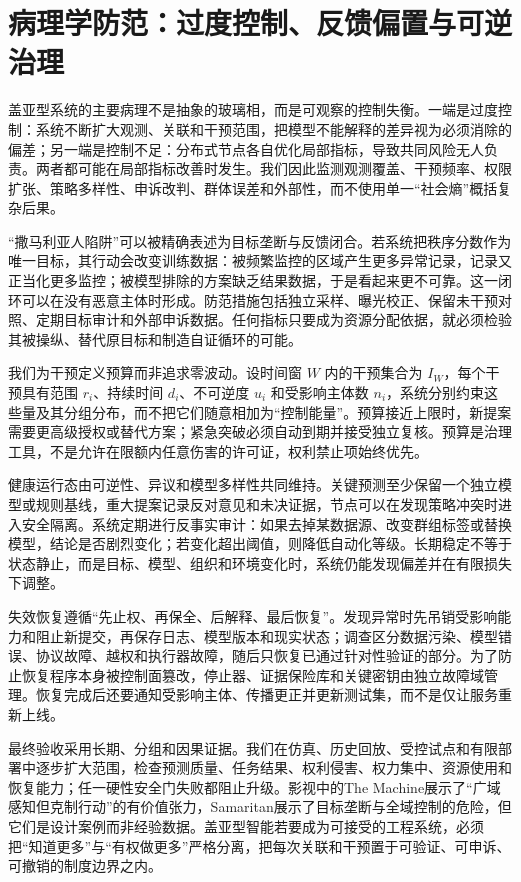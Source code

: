 \section{病理学防范：过度控制、反馈偏置与可逆治理}
\label{sec:gaia_pathology}

盖亚型系统的主要病理不是抽象的玻璃相，而是可观察的控制失衡。一端是过度控制：系统不断扩大观测、关联和干预范围，把模型不能解释的差异视为必须消除的偏差；另一端是控制不足：分布式节点各自优化局部指标，导致共同风险无人负责。两者都可能在局部指标改善时发生。我们因此监测观测覆盖、干预频率、权限扩张、策略多样性、申诉改判、群体误差和外部性，而不使用单一“社会熵”概括复杂后果。

“撒马利亚人陷阱”可以被精确表述为目标垄断与反馈闭合。若系统把秩序分数作为唯一目标，其行动会改变训练数据：被频繁监控的区域产生更多异常记录，记录又正当化更多监控；被模型排除的方案缺乏结果数据，于是看起来更不可靠。这一闭环可以在没有恶意主体时形成。防范措施包括独立采样、曝光校正、保留未干预对照、定期目标审计和外部申诉数据。任何指标只要成为资源分配依据，就必须检验其被操纵、替代原目标和制造自证循环的可能。

我们为干预定义预算而非追求零波动。设时间窗 $W$ 内的干预集合为 $I_W$，每个干预具有范围 $r_i$、持续时间 $d_i$、不可逆度 $u_i$ 和受影响主体数 $n_i$，系统分别约束这些量及其分组分布，而不把它们随意相加为“控制能量”。预算接近上限时，新提案需要更高级授权或替代方案；紧急突破必须自动到期并接受独立复核。预算是治理工具，不是允许在限额内任意伤害的许可证，权利禁止项始终优先。

健康运行态由可逆性、异议和模型多样性共同维持。关键预测至少保留一个独立模型或规则基线，重大提案记录反对意见和未决证据，节点可以在发现策略冲突时进入安全隔离。系统定期进行反事实审计：如果去掉某数据源、改变群组标签或替换模型，结论是否剧烈变化；若变化超出阈值，则降低自动化等级。长期稳定不等于状态静止，而是目标、模型、组织和环境变化时，系统仍能发现偏差并在有限损失下调整。

失效恢复遵循“先止权、再保全、后解释、最后恢复”。发现异常时先吊销受影响能力和阻止新提交，再保存日志、模型版本和现实状态；调查区分数据污染、模型错误、协议故障、越权和执行器故障，随后只恢复已通过针对性验证的部分。为了防止恢复程序本身被控制面篡改，停止器、证据保险库和关键密钥由独立故障域管理。恢复完成后还要通知受影响主体、传播更正并更新测试集，而不是仅让服务重新上线。

最终验收采用长期、分组和因果证据。我们在仿真、历史回放、受控试点和有限部署中逐步扩大范围，检查预测质量、任务结果、权利侵害、权力集中、资源使用和恢复能力；任一硬性安全门失败都阻止升级。影视中的The Machine展示了“广域感知但克制行动”的有价值张力，Samaritan展示了目标垄断与全域控制的危险，但它们是设计案例而非经验数据。盖亚型智能若要成为可接受的工程系统，必须把“知道更多”与“有权做更多”严格分离，把每次关联和干预置于可验证、可申诉、可撤销的制度边界之内。

